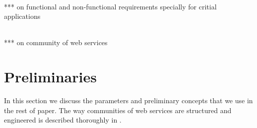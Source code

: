 \documentclass[10pt, conference, compsocconf]{IEEEtran}
\theoremstyle{plain}
\theoremstyle{definition}
\begin{document}
\\ *** on functional and non-functional requirements specially for critial applications

\\ *** on community of web services

\cite{DBLP:conf/IEEEscc/KhosravifarABT11}
\cite{DBLP:conf/IEEEscc/LimTMB12}



%
%

\section{Preliminaries}

In this section we discuss the parameters and preliminary concepts that we use in the rest of paper. The way communities of web services are structured and engineered is described thoroughly in \cite{DBLP:journals/ijebr/MaamarSTBB09}. 
\end{document}
